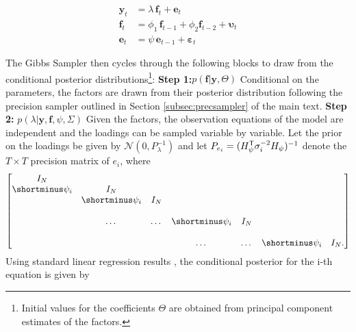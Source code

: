 \documentclass[notitlepage,a4paper,12pt]{article}
\begin{document}
\begin{ThreePartTable}
\begin{subequations}
    \label{eqn:app_model}
    \begin{align}
        \mathbf{y}_t &=  \lambda \, \mathbf{f}_{t} + \mathbf{e}_t \label{eqn:app_facmod_obs}\\ 
        \mathbf{f}_t &= \phi_1 \, \mathbf{f}_{t-1} + \phi_2 \mathbf{f}_{t-2} + \boldsymbol{\upsilon}_t \label{eqn:app_facmod_factors}\\
        \mathbf{e}_t &= \psi \, \mathbf{e}_{t-1} + \boldsymbol{\varepsilon}_t \label{eqn:app_facmod_idios}
    \end{align}
\end{subequations}

The Gibbs Sampler then cycles through the following blocks to draw from the conditional posterior distributions\footnote{Initial values for the coefficients  $\Theta$ are obtained from principal component estimates of the factors. 
}:
\newline
\linebreak
\textbf{Step 1:}$p(\mathbf{f}|\mathbf{y}, \Theta)$
\newline
Conditional on the parameters, the factors are drawn from their posterior distribution following the precision sampler outlined in Section \ref{subsec:precsampler} of the main text.
\newline
\linebreak
\textbf{Step 2:} $p(\lambda| \mathbf{y}, \mathbf{f}, \psi, \Sigma)$
\newline
Given the factors, the observation equations of the model are independent and the loadings can be sampled variable by variable. Let the prior on the loadings be given by $\mathcal{N}(0, P_{\lambda}^{-1})$ and let $P_{e_i} = (H^{\sf{T}}_{\psi} \sigma^{-2}_i H_{\psi})^{-1}$ denote the $T \times T$ precision matrix of $e_i$, where 
$$
\begin{bmatrix}
    I_N &  \\
    \shortminus \psi_i & I_N &  \\
     & \shortminus \psi_i & I_N &  \\
     &  &  &  &  & \\
    & \dots & \dots & \shortminus \psi_i & I_N \\
     &  &  &  &  & \\
    & &  & \dots & \dots & \shortminus \psi_i & I_N.
\end{bmatrix}
$$
Using standard linear regression results \citep[see][]{chankroese_2013}, the conditional posterior for the i-th equation is given by

\end{ThreePartTable}
\end{document}
